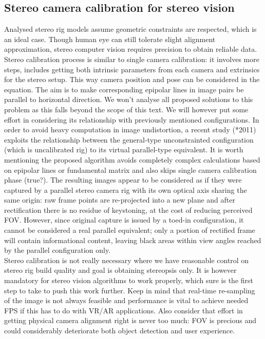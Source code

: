 \subsection{Stereo camera calibration for stereo vision}
Analysed stereo rig models assume geometric constraints are respected, which is an ideal case. Though human eye can still tolerate slight alignment approximation, stereo computer vision requires precision to obtain reliable data. Stereo calibration process is similar to single camera calibration: it involves more steps, includes getting both intrinsic parameters from each camera and extrinsics for the stereo setup. This way camera position and pose can be considered in the equation. The aim is to make corresponding epipolar lines in image pairs be parallel to horizontal direction. We won’t analyse all proposed solutions to this problem as this falls beyond the scope of this text. We will however put some effort in considering its relationship with previously mentioned configurations. In order to avoid heavy computation in image undistortion, a recent study (*2011) exploits the relationship between the general-type unconstrainted configuration (which is uncalibrated rig) to its virtual parallel-type equivalent. It is worth mentioning the proposed algorithm avoids completely complex calculations based on epipolar lines or fundamental matrix and also skips single camera calibration phase (true?). The resulting images appear to be considered as if they were captured by a parallel stereo camera rig with its own optical axis sharing the same origin: raw frame points are re-projected into a new plane and after rectification there is no residue of keystoning, at the cost of reducing perceived FOV. However, since original capture is issued by a toed-in configuration, it cannot be considered a real parallel equivalent; only a portion of rectified frame will contain informational content, leaving black areas within view angles reached by the parallel configuration only.\\
Stereo calibration is not really necessary where we have reasonable control on stereo rig build quality and goal is obtaining stereopsis only. It is however mandatory for stereo vision algorithms to work properly, which sure is the first step to take to push this work further. Keep in mind that real-time re-sampling of the image is not always feasible and performance is vital to achieve needed FPS if this has to do with VR/AR applications. Also consider that effort in getting physical camera alignment right is never too much: FOV is precious and could considerably deteriorate both object detection and user experience.

